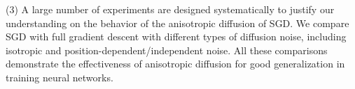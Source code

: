 \documentclass{article}
\begin{document}
(3) A large number of experiments are designed systematically to justify our understanding on the behavior of the anisotropic diffusion of SGD.
We compare SGD with full gradient descent with different types of diffusion noise, including isotropic and position-dependent/independent noise.
All these comparisons demonstrate the effectiveness of anisotropic diffusion for good generalization in training neural networks.


\end{document}
